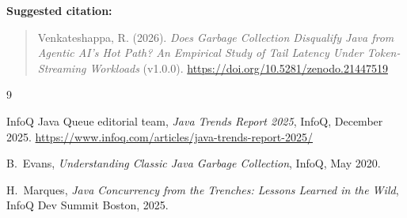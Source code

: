 \documentclass[11pt]{article}
\begin{document}
\noindent\textbf{Suggested citation:}
\begin{quote}
Venkateshappa, R. (2026). \emph{Does Garbage Collection Disqualify Java from Agentic AI's Hot
Path? An Empirical Study of Tail Latency Under Token-Streaming Workloads} (v1.0.0).
\url{https://doi.org/10.5281/zenodo.21447519}
\end{quote}

\begin{thebibliography}{9}

InfoQ Java Queue editorial team,
\emph{Java Trends Report 2025},
InfoQ, December 2025.
\url{https://www.infoq.com/articles/java-trends-report-2025/}

B.~Evans,
\emph{Understanding Classic Java Garbage Collection},
InfoQ, May 2020.

H.~Marques,
\emph{Java Concurrency from the Trenches: Lessons Learned in the Wild},
InfoQ Dev Summit Boston, 2025.

\end{thebibliography}
\end{document}
